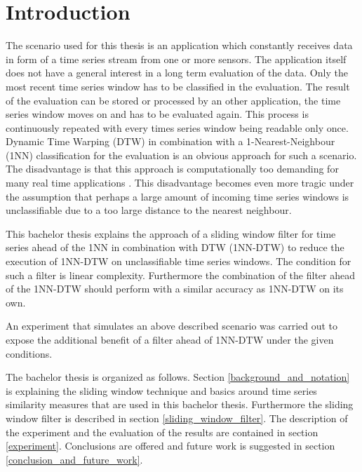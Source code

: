 \section{Introduction} \label{introduction}
The scenario used for this thesis is an application which constantly receives data in form of a time series stream from
one or more sensors. The application itself does not have a general interest in a long term evaluation of the data. Only
the most recent time series window has to be classified in the evaluation. The result of the evaluation can be stored or
processed by an other application, the time series window moves on and has to be evaluated again. This process is
continuously repeated with every times series window being readable only once. Dynamic Time Warping (DTW) in combination
with a 1-Nearest-Neighbour (1NN) classification for the evaluation is an obvious approach for such a scenario. The
disadvantage is that this approach is computationally too demanding for many real time applications \cite{xi2006fast}.
This disadvantage becomes even more tragic under the assumption that perhaps a large amount of incoming time series
windows is unclassifiable due to a too large distance to the nearest neighbour.

This bachelor thesis explains the approach of a sliding window filter for time series ahead of the 1NN in combination
with DTW (1NN-DTW) to reduce the execution of 1NN-DTW on unclassifiable time series windows. The condition for such a
filter is linear complexity. Furthermore the combination of the filter ahead of the 1NN-DTW should perform with a
similar accuracy as 1NN-DTW on its own.

An experiment that simulates an above described scenario was carried out to expose the additional benefit of a filter
ahead of 1NN-DTW under the given conditions.

The bachelor thesis is organized as follows. Section \ref{background_and_notation} is explaining the sliding window
technique and basics around time series similarity measures that are used in this bachelor thesis. Furthermore
the sliding window filter is described in section \ref{sliding_window_filter}. The description of the experiment and the
evaluation of the results are contained in section \ref{experiment}. Conclusions are offered and future work
is suggested in section \ref{conclusion_and_future_work}.
